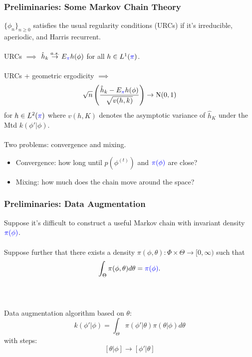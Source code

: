 \documentclass[xcolor=dvipsnames]{beamer}
\begin{document}
\begin{frame}
\frametitle{Preliminaries: Some Markov Chain Theory}
$\{\phi_n\}_{n\geq 0}$ satisfies the usual regularity conditions (URCs) if it's irreducible, aperiodic, and Harris recurrent. \\~\\

\pause URCs $\implies$ $\hat{h}_k \stackrel{a.s.}{\to} E_{\color{blue}\pi}h(\phi)$ for all $h\in L^1({\color{blue}\pi})$.\\~\\
URCs + geometric ergodicity $\implies$ 
\[
\sqrt{n}\left(\frac{\hat{h}_k - E_{\color{blue}\pi}h(\phi)}{\sqrt{v(h,k)}}\right) \to \mbox{N}(0,1)
\]
for $h\in L^2({\color{blue}\pi})$ where $v(h,K)$ denotes the asymptotic variance of $\hat{h}_K$ under the Mtd $k(\phi'|\phi)$.\\~\\

\pause Two problems: convergence and mixing.
\begin{itemize}
\item[] Convergence: how long until $p(\phi^{(t)})$ and ${\color{blue}\pi(\phi)}$ are close?
\item[] Mixing: how much does the chain move around the space?
\end{itemize}

\end{frame}

\begin{frame}
\frametitle{Preliminaries: Data Augmentation}
Suppose it's difficult to construct a useful Markov chain with invariant density ${\color{blue}\pi(\phi)}$.\\~\\

Suppose further that there exists a density $\pi(\phi,\theta):\Phi\times\Theta\to [0,\infty)$ such that
\[
\int_{\Theta}\pi(\phi,\theta)d\theta = {\color{blue}\pi(\phi)}.
\]
\\~

\pause Data augmentation algorithm \citep{tanner1987calculation} based on $\theta$:
\[
k(\phi'|\phi)=\int_{\Theta}\pi(\phi'|\theta)\pi(\theta|\phi)d\theta
\]
with steps:
\[
[\theta|\phi]\to[\phi'|\theta]
\]
\end{frame}
\end{document}
